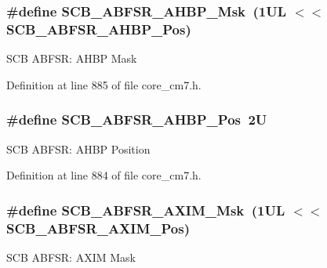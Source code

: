 \subsubsection[{\texorpdfstring{S\+C\+B\+\_\+\+A\+B\+F\+S\+R\+\_\+\+A\+H\+B\+P\+\_\+\+Msk}{SCB_ABFSR_AHBP_Msk}}]{\setlength{\rightskip}{0pt plus 5cm}\#define S\+C\+B\+\_\+\+A\+B\+F\+S\+R\+\_\+\+A\+H\+B\+P\+\_\+\+Msk~(1\+U\+L $<$$<$ S\+C\+B\+\_\+\+A\+B\+F\+S\+R\+\_\+\+A\+H\+B\+P\+\_\+\+Pos)}\hypertarget{group___c_m_s_i_s___s_c_b_gabfc67aa93bca5ddd4b0f0a47b372383e}{}\label{group___c_m_s_i_s___s_c_b_gabfc67aa93bca5ddd4b0f0a47b372383e}
S\+CB A\+B\+F\+SR\+: A\+H\+BP Mask 

Definition at line 885 of file core\+\_\+cm7.\+h.

\subsubsection[{\texorpdfstring{S\+C\+B\+\_\+\+A\+B\+F\+S\+R\+\_\+\+A\+H\+B\+P\+\_\+\+Pos}{SCB_ABFSR_AHBP_Pos}}]{\setlength{\rightskip}{0pt plus 5cm}\#define S\+C\+B\+\_\+\+A\+B\+F\+S\+R\+\_\+\+A\+H\+B\+P\+\_\+\+Pos~2U}\hypertarget{group___c_m_s_i_s___s_c_b_ga5c97d4cc05972dc80963e74eb2332841}{}\label{group___c_m_s_i_s___s_c_b_ga5c97d4cc05972dc80963e74eb2332841}
S\+CB A\+B\+F\+SR\+: A\+H\+BP Position 

Definition at line 884 of file core\+\_\+cm7.\+h.

\subsubsection[{\texorpdfstring{S\+C\+B\+\_\+\+A\+B\+F\+S\+R\+\_\+\+A\+X\+I\+M\+\_\+\+Msk}{SCB_ABFSR_AXIM_Msk}}]{\setlength{\rightskip}{0pt plus 5cm}\#define S\+C\+B\+\_\+\+A\+B\+F\+S\+R\+\_\+\+A\+X\+I\+M\+\_\+\+Msk~(1\+U\+L $<$$<$ S\+C\+B\+\_\+\+A\+B\+F\+S\+R\+\_\+\+A\+X\+I\+M\+\_\+\+Pos)}\hypertarget{group___c_m_s_i_s___s_c_b_gac24348e5ec8392f4a076c7ba690aae48}{}\label{group___c_m_s_i_s___s_c_b_gac24348e5ec8392f4a076c7ba690aae48}
S\+CB A\+B\+F\+SR\+: A\+X\+IM Mask 

